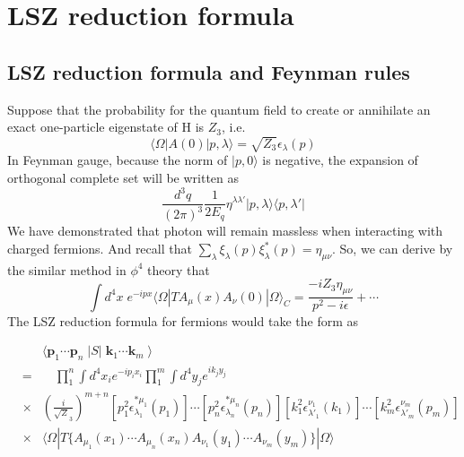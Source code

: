 \section{LSZ reduction formula}
\subsection{LSZ reduction formula and Feynman rules}
\noindent
Suppose that the probability for the quantum field to create or annihilate an exact one-particle eigenstate of H is $Z_3$, i.e.
\[\langle \Omega | A(0) | p,\lambda \rangle = \sqrt{Z_3} \epsilon_{\lambda}(p)\]
In Feynman gauge, because the norm of $|p,0\rangle$ is negative, the expansion of orthogonal complete set will be written as
\[\frac{d^3q}{(2\pi)^3} \frac{1}{2E_q} \eta^{\lambda\lambda'} | p,\lambda\rangle\langle p, \lambda' |\]
We have demonstrated that photon will remain massless when interacting with charged fermions. And recall that $\sum_{\lambda}\xi_{\lambda}(p)\xi^{*}_{\lambda}(p) = \eta_{\mu\nu}$. So, we can derive by the similar method in $\phi^4$ theory that
\[\int d^4x \; e^{-ipx} \langle \Omega | T A_{\mu}(x) A_{\nu}(0) | \Omega \rangle_C = \frac{-iZ_3\eta_{\mu\nu}}{p^2-i\epsilon} + \cdots \]
The LSZ reduction formula for fermions would take the form as
\\

\begin{newthem}
\begin{eqnarray}
&\phantom{=}& \langle \bm{p}_1 \cdots \bm{p}_n \; | S | \; \bm{k}_1 \cdots \bm{k}_m \; \rangle  
\nonumber \\
&=& \quad \prod_1^n \int d^4 x_i e^{-i p_ix_i } \prod_1^m \int d^4 y_j e^{ik_jy_j} 
\nonumber \\
&\times & \left( \frac{i}{\sqrt{Z}_3} \right) ^{m+n}  [p_1^2 \epsilon^{*\mu_1}_{\lambda_1}(p_1)] \cdots [p_n^2 \epsilon^{*\mu_n}_{\lambda_n}(p_n)] [k_1^2 \epsilon^{ \nu_1}_{\lambda'_1}(k_1)] \cdots [k_m^2 \epsilon^{ \nu_m}_{\lambda'_m}(p_m)]
\nonumber \\
&\times & \langle \Omega | T \{A_{\mu_1}(x_1) \cdots A_{\mu_n}(x_n)
A_{\nu_1}(y_1) \cdots A_{\nu_m}(y_m) \} | \Omega \rangle
\nonumber
\end{eqnarray}
\end{newthem}

